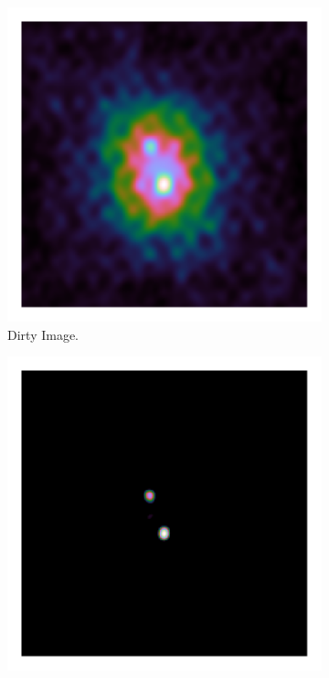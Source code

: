 \begin{figure}[h]
	\centering
	\begin{subfigure}[b]{0.3\linewidth}
		\includegraphics[width=\linewidth, clip, trim= 0.25in 0.25in 0.25in 0.25in]{./chapters/03.cd/simulated/dirty.png}
		\caption{Dirty Image.}
		\label{cd:serial:aid:dirty}
	\end{subfigure}
	\begin{subfigure}[b]{0.3\linewidth}
		\includegraphics[width=\linewidth, clip, trim= 0.25in 0.25in 0.25in 0.25in]{./chapters/03.cd/simulated/elasticNet.png}

\end{subfigure}
\end{figure}
